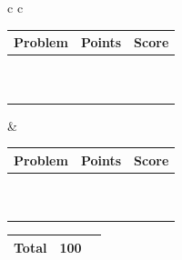 \documentclass[12pt]{article}
\begin{document}
\begin{center}

\begin{tabular}{c c}

\begin{tabular}{|*{3}{>{\centering\arraybackslash}p{.1\linewidth}|}}
    \hline
    \textbf{Problem} & \textbf{Points} & \textbf{Score} \\
    \hline
    1 & 5 &  \\
    \hline
    2 & 5 &  \\
    \hline
    3 & 5 &  \\
    \hline
    4 & 5 &  \\
    \hline
    5 & 5 &  \\
    \hline
    6 & 5 &  \\
    \hline
    7 & 5 &  \\
    \hline
    8 & 5 &  \\
    \hline
    9 & 5 &  \\
    \hline
    10 & 5 &  \\
    \hline
\end{tabular}

&

\begin{tabular}{|*{3}{>{\centering\arraybackslash}p{.1\linewidth}|}}
    \hline
    \textbf{Problem} & \textbf{Points} & \textbf{Score} \\
    \hline
    11 & 5 &  \\
    \hline
    12 & 5 &  \\
    \hline
    13 & 5 &  \\
    \hline
    14 & 5 &  \\
    \hline
    15 & 5 &  \\
    \hline
    16 & 5 &  \\
    \hline
    17 & 5 &  \\
    \hline
    18 & 5 &  \\
    \hline
    19 & 5 &  \\
    \hline
    20 & 5 &  \\
    \hline
\end{tabular}

\end{tabular}

\vspace{1em}

\begin{tabular}{|c|c|c|}
    \hline
    \textbf{Total} & 100 & \text{\hspace{2cm}}\\
    \hline
\end{tabular}

\end{center}
\end{document}
